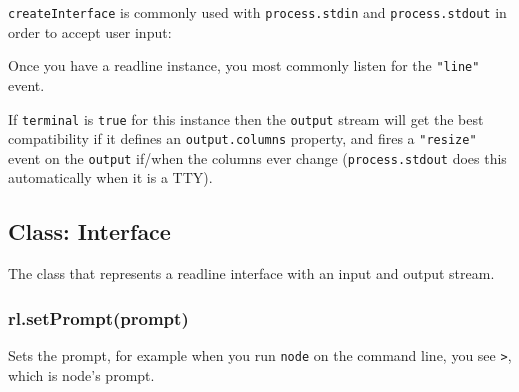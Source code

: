 \begin{Shaded}
\begin{Highlighting}[]
 
  \NormalTok{(}\NormalTok{, [[}\NormalTok{], linePartial]);}
\NormalTok{\}}
\end{Highlighting}
\end{Shaded}

\texttt{createInterface} is commonly used with \texttt{process.stdin}
and \texttt{process.stdout} in order to accept user input:

\begin{Shaded}
\begin{Highlighting}[]
 \NormalTok{(}\NormalTok{);}
 \NormalTok{(\{}
  \NormalTok{: }\NormalTok{,}
  \NormalTok{: }
\NormalTok{\});}
\end{Highlighting}
\end{Shaded}

Once you have a readline instance, you most commonly listen for the
\texttt{"line"} event.

If \texttt{terminal} is \texttt{true} for this instance then the
\texttt{output} stream will get the best compatibility if it defines an
\texttt{output.columns} property, and fires a \texttt{"resize"} event on
the \texttt{output} if/when the columns ever change
(\texttt{process.stdout} does this automatically when it is a TTY).

\subsection{Class: Interface}\label{class-interface}

The class that represents a readline interface with an input and output
stream.

\subsubsection{rl.setPrompt(prompt)}\label{rl.setpromptprompt}

Sets the prompt, for example when you run \texttt{node} on the command
line, you see \texttt{\textgreater{}}, which is node's prompt.

